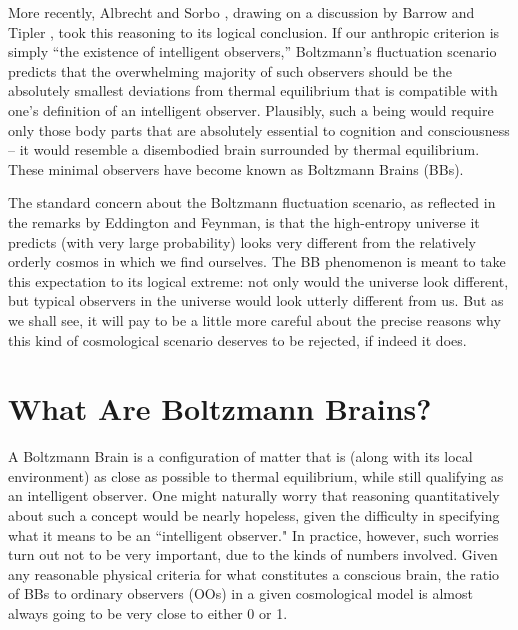 \documentclass[12pt,letterpaper]{article}
\begin{document}
More recently, Albrecht and Sorbo \cite{Albrecht:2004ke,Albrecht:2002uz}, drawing on a discussion by Barrow and Tipler \cite{barrowtipler}, took this reasoning to its logical conclusion.
If our anthropic criterion is simply ``the existence of intelligent observers,'' Boltzmann's fluctuation scenario predicts that the overwhelming majority of such observers should be the absolutely smallest deviations from thermal equilibrium that is compatible with one's definition of an intelligent observer.
Plausibly, such a being would require only those body parts that are absolutely essential to cognition and consciousness -- it would resemble a disembodied brain surrounded by thermal equilibrium.
These minimal observers have become known as Boltzmann Brains (BBs).

The standard concern about the Boltzmann fluctuation scenario, as reflected in the remarks by Eddington and Feynman, is that the high-entropy universe it predicts (with very large probability) looks very different from the relatively orderly cosmos in which we find ourselves. 
The BB phenomenon is meant to take this expectation to its logical extreme: not only would the universe look different, but typical observers in the universe would look utterly different from us. 
But as we shall see, it will pay to be a little more careful about the precise reasons why this kind of cosmological scenario deserves to be rejected, if indeed it does.


\section{What Are Boltzmann Brains?}

A Boltzmann Brain is a configuration of matter that is (along with its local environment) as close as possible to thermal equilibrium, while still qualifying as an intelligent observer.
One might naturally worry that reasoning quantitatively about such a concept would be nearly hopeless, given the difficulty in specifying what it means to be an ``intelligent observer."
In practice, however, such worries turn out not to be very important, due to the kinds of numbers involved.
Given any reasonable physical criteria for what constitutes a conscious brain, the ratio of BBs to ordinary observers (OOs) in a given cosmological model is almost always going to be very close to either 0 or 1.
\end{document}
